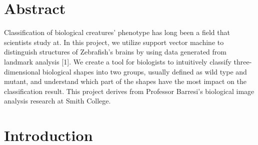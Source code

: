 \documentclass[10pt,letterpaper]{article}
\date{}
\newcommand{\getIndex}[2]{
  \ForEach{,}{\IfEq{#1}{\thislevelitem}{\number\thislevelcount\ExitForEach}{}}{#2}
}
\newcommand{\getAff}[1]{
  \getIndex{#1}{Smith College}
}
\begin{document}
\vspace*{0.2in}

\section*{Abstract}
Classification of biological creatures' phenotype has long been a field
that scientists study at. In this project, we utilize support vector
machine to distinguish structures of Zebrafish's brains by using data
generated from landmark analysis {[}1{]}. We create a tool for
biologists to intuitively classify three-dimensional biological shapes
into two groups, usually defined as wild type and mutant, and understand
which part of the shapes have the most impact on the classification
result. This project derives from Professor Barresi's biological image
analysis research at Smith College.


\linenumbers

\newpage

\section{Introduction}\label{introduction}
\end{document}
